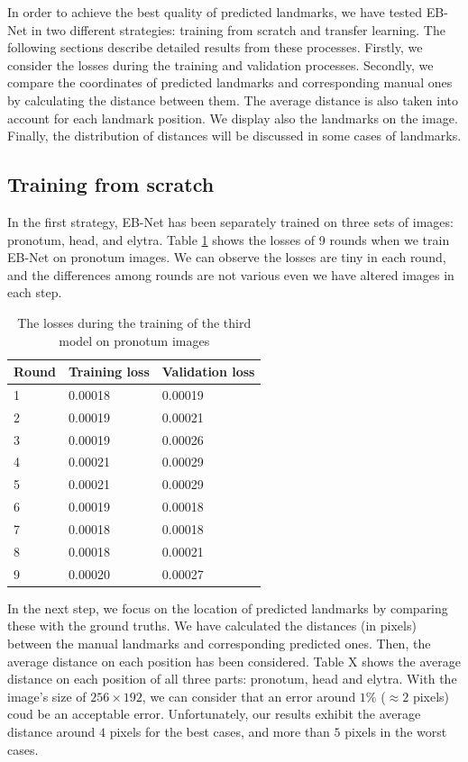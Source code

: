 \documentclass[review]{elsarticle}
\begin{document}
In order to achieve the best quality of predicted landmarks, we have tested EB-Net in two different strategies: training from scratch and transfer learning. The following sections describe detailed results from these processes. Firstly, we consider the losses during the training and validation processes. Secondly, we compare the coordinates of predicted landmarks and corresponding manual ones by calculating the distance between them. The average distance is also taken into account for each landmark position. We display also the landmarks on the image. Finally, the distribution of distances will be discussed in some cases of landmarks. 

\subsection{Training from scratch}
In the first strategy, EB-Net has been separately trained on three sets of images: pronotum, head, and elytra. Table \ref{tbltrainingloss} shows the losses of 9 rounds when we train EB-Net on pronotum images. We can observe the losses are tiny in each round, and the differences among rounds are not various even we have altered images in each step.

\begin{table}[h!]
	\centering
	\begin{tabular}{l l l}
	Round & Training loss & Validation loss \\ \hline
	1 & 0.00018 & 0.00019  \\ \hline
	2 & 0.00019 & 0.00021 \\ \hline
	3 & 0.00019 & 0.00026 \\ \hline
	4 & 0.00021 & 0.00029 \\ \hline
	5 & 0.00021 & 0.00029 \\ \hline
	6 & 0.00019 & 0.00018 \\ \hline
	7 & 0.00018 & 0.00018 \\ \hline
	8 & 0.00018 & 0.00021 \\ \hline
	9 & 0.00020 & 0.00027 \\ \hline
	\end{tabular}
	\caption{The losses during the training of the third model on pronotum images}
	\label{tbltrainingloss}
\end{table}

In the next step, we focus on the location of predicted landmarks by comparing these with the ground truths. We have calculated the distances (in pixels) between the manual landmarks and corresponding predicted ones. Then, the average distance on each position has been considered. Table X shows the average distance on each position of all three parts: pronotum, head and elytra. With the image's size of $256 \times 192$, we can consider that an error around $1\%$ ($\approx 2$ pixels) coud be an acceptable error. Unfortunately, our results exhibit the average distance around $4$ pixels for the best cases, and more than $5$ pixels in the worst cases.
\end{document}
